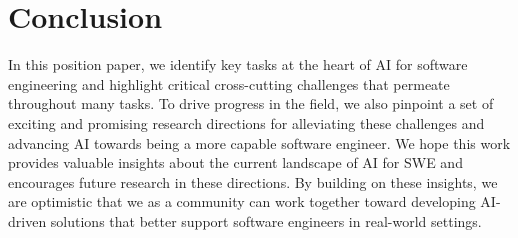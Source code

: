 \vspace{-0.2cm}

\section{Conclusion}
In this position paper, we identify key tasks at the heart of AI for software engineering and highlight critical cross-cutting challenges that permeate throughout many tasks. To drive progress in the field, we also pinpoint a set of exciting and promising research directions for alleviating these challenges and advancing AI towards being a more capable software engineer. We hope this work provides valuable insights about the current landscape of AI for SWE and encourages future research in these directions. By building on these insights, we are optimistic that we as a community can work together toward developing AI-driven solutions that better support software engineers in real-world settings.